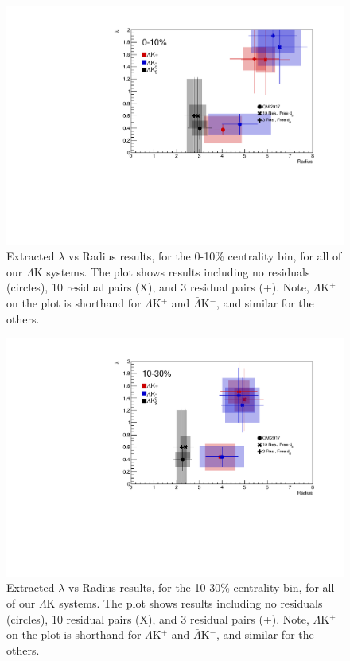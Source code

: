 \documentclass[../AnalysisNoteJBuxton.tex]{subfiles}
\begin{document}
\begin{figure}[h]
  \centering
  \includegraphics[width=\textwidth]{7_ResultsAndDiscussion/Figures/CompareAllRadiusvsLambdaAcrossAnalyses_0010_10ResAnd3Res_10and3SeparateOnly_FreeD0Only.pdf}
  \caption[$\lambda$ vs. R (0-10\% Centrality)]{Extracted $\lambda$ vs Radius results, for the 0-10\% centrality bin, for all of our $\Lambda$K systems.  The plot shows results including no residuals (circles), 10 residual pairs (X), and 3 residual pairs (+).  Note, $\Lambda$K$^{+}$ on the plot is shorthand for $\Lambda$K$^{+}$ and $\bar{\Lambda}$K$^{-}$, and similar for the others.}
  \label{fig:LambdavsR_0010_FreeD0Only}
\end{figure}

\begin{figure}[h]
  \centering
  \includegraphics[width=\textwidth]{7_ResultsAndDiscussion/Figures/CompareAllRadiusvsLambdaAcrossAnalyses_1030_10ResAnd3Res_10and3SeparateOnly_FreeD0Only.pdf}
  \caption[$\lambda$ vs. R (10-30\% Centrality)]{Extracted $\lambda$ vs Radius results, for the 10-30\% centrality bin, for all of our $\Lambda$K systems.  The plot shows results including no residuals (circles), 10 residual pairs (X), and 3 residual pairs (+).  Note, $\Lambda$K$^{+}$ on the plot is shorthand for $\Lambda$K$^{+}$ and $\bar{\Lambda}$K$^{-}$, and similar for the others.}
  \label{fig:LambdavsR_1030_FreeD0Only}
\end{figure}
\end{document}
